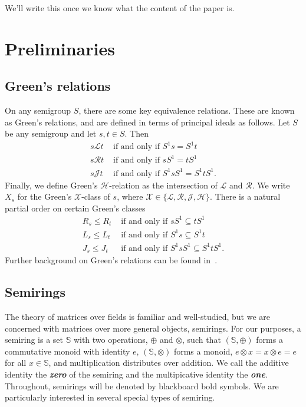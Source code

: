 \documentclass[11pt]{article}
\newcommand{\defn}[1]{\textbf{\textit{#1}}}
\numberwithin{equation}{section}
\renewcommand{\L}{\mathscr{L}}
\newcommand{\R}{\mathscr{R}}
\newcommand{\J}{\mathscr{J}}
\renewcommand{\H}{\mathscr{H}}
\begin{document}
We'll write this once we know what the content of the paper is.

\section{Preliminaries}
\label{section-preliminaries}

\subsection{Green's relations}
On any semigroup $S$, there are some key equivalence relations. These are known
as Green's relations, and are defined in terms of principal ideals as follows.
Let $S$ be any semigroup and let $s, t \in S$. Then
\begin{align*}
  s \L t &\text{ if and only if } S^1 s = S^1 t \\
  s \R t &\text{ if and only if } s S^1 = t S^1 \\
  s \J t &\text{ if and only if } S^1 s S^1 = S^1 t S^1.
\end{align*}
Finally, we define Green's $\H$-relation as the intersection of $\L$ and $\R$.
We write $X_s$ for the Green's $\mathcal{X}$-class of $s$, where
$\mathcal{X} \in \{\L, \R, \J, \H\}$.
There is a natural partial order on certain Green's classes
\begin{align*}
  R_s \leq R_t &\text{ if and only if } sS^1 \subseteq tS^1 \\
  L_s \leq L_t &\text{ if and only if } S^1s \subseteq S^1t \\
  J_s \leq J_t &\text{ if and only if } S^1 s S^1 \subseteq S^1 t S^1.
\end{align*}
Further background on Green's relations can be found in~\cite{Howie1995aa}.

\subsection{Semirings}
The theory of matrices over fields is familiar and well-studied, but we are
concerned with matrices over more general objects, semirings. For our purposes,
a semiring is a set $\mathbb{S}$ with two operations, $\oplus$ and $\otimes$,
such that $(\mathbb{S}, \oplus)$ forms a commutative monoid with identity $e$,
$(\mathbb{S}, \otimes)$ forms a monoid, $e\otimes x = x\otimes e = e$ for all $x
\in \mathbb{S}$, and multiplication distributes over addition. We call the
additive identity the \defn{zero} of the semiring and the multipicative identity
the \defn{one}. Throughout, semirings will be denoted by blackboard bold
symbols. We are particularly interested in several special types of semiring.
\end{document}
